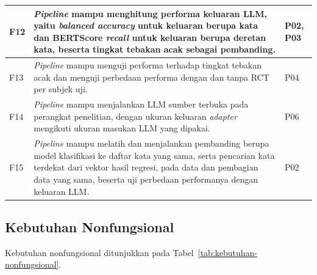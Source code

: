 {\begin{longtable}{| l | Z{0.68\textwidth} | l |}
    \hline
    F12 & \textit{Pipeline} mampu menghitung performa keluaran LLM, yaitu \textit{balanced accuracy} untuk keluaran berupa kata dan BERTScore \textit{recall} untuk keluaran berupa deretan kata, beserta tingkat tebakan acak sebagai pembanding. & P02, P03 \\
    \hline
    F13 & \textit{Pipeline} mampu menguji performa terhadap tingkat tebakan acak dan menguji perbedaan performa dengan dan tanpa RCT per subjek uji. & P04 \\
    \hline
    F14 & \textit{Pipeline} mampu menjalankan LLM sumber terbuka pada perangkat penelitian, dengan ukuran keluaran \textit{adapter} mengikuti ukuran masukan LLM yang dipakai. & P06 \\
    \hline
    F15 & \textit{Pipeline} mampu melatih dan menjalankan pembanding berupa model klasifikasi ke daftar kata yang sama, serta pencarian kata terdekat dari vektor hasil regresi, pada data dan pembagian data yang sama, beserta uji perbedaan performanya dengan keluaran LLM. & P02 \\
    \hline
\end{longtable}
}

\subsection{Kebutuhan Nonfungsional}
Kebutuhan nonfungsional ditunjukkan pada Tabel~\ref{tab:kebutuhan-nonfungsional}.

